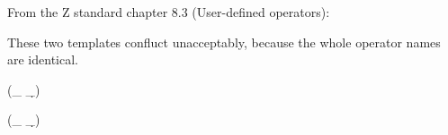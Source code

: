 From the Z standard chapter 8.3 (User-defined operators):

These two templates confluct unacceptably, because the whole
operator names are identical.

\begin{zed}
 \leftassoc (\_ \d \_)
\end{zed}

\begin{zed}
 \leftassoc (\_ \d \_)
\end{zed}
